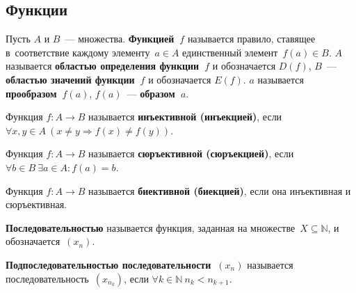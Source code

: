 \subsection{Функции}
 Пусть $A$ и $B$~--- множества.
\textbf{Функцией~$f$} называется правило, ставящее в~соответствие каждому элементу~$a \in A$ единственный элемент~$f(a) \in B$.
$A$ называется \textbf{областью определения функции~$f$} и обозначается $D(f)$, $B$~--- \textbf{областью значений функции~$f$} и обозначается $E(f)$.
$a$ называется \textbf{прообразом~$f(a)$}, $f(a)$~--- \textbf{образом~$a$}.

 Функция $f \colon A \to B$ называется \textbf{инъективной (инъекцией)}, если
$\forall x, y \in A	\ \allowbreak (x \neq y \Rightarrow f(x) \neq f(y))$.

 Функция $f \colon A \to B$ называется \textbf{сюръективной (сюръекцией)}, если
$\forall b \in B \ \allowbreak \exists a \in A \colon \allowbreak f(a) = b$.

 Функция $f \colon A \to B$ называется \textbf{биективной (биекцией)}, если она инъективная и сюръективная.

 \textbf{Последовательностью} называется функция, заданная на множестве~$X \subseteq \mathbb N$, и обозначается~$(x_n)$.

\textbf{Подпоследовательностью последовательности~$(x_n)$} называется последовательность~$(x_{n_k})$, если $\forall k \in \mathbb N \ n_k < n_{k+1}$.